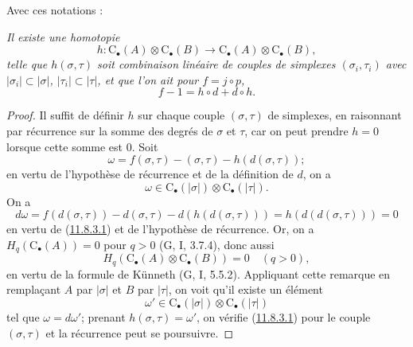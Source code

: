 Avec ces notations :
\begin{proposition}[11.8.3]
\label{0.11.8.3-fr}
\emph{Il existe une homotopie
\[
h:\mathrm C_\bullet(A)\otimes\mathrm C_\bullet(B)
\longrightarrow\mathrm C_\bullet(A)\otimes\mathrm C_\bullet(B),
\]
telle que $h(\sigma,\tau)$ soit combinaison linéaire de couples de simplexes
$(\sigma_i,\tau_i)$ avec $|\sigma_i|\subset|\sigma|$,
$|\tau_i|\subset|\tau|$, et que l'on ait pour $f=j\circ p$,}
\[
\label{0.11.8.3.1-fr}
\tag{11.8.3.1}
f-1=h\circ d+d\circ h.
\]
\end{proposition}

\begin{proof}
Il suffit de définir $h$ sur chaque couple $(\sigma,\tau)$ de simplexes, en
raisonnant par récurrence sur la somme des degrés de $\sigma$ et $\tau$, car
on peut prendre $h=0$ lorsque cette somme est $0$. Soit
\[
\omega=f(\sigma,\tau)-(\sigma,\tau)-h(d(\sigma,\tau));
\]
en vertu de l'hypothèse de récurrence et de la définition de $d$, on a
\[
\omega\in\mathrm C_\bullet(|\sigma|)\otimes\mathrm C_\bullet(|\tau|).
\]
On a
\[
d\omega=f(d(\sigma,\tau))-d(\sigma,\tau)-d(h(d(\sigma,\tau)))
=h(d(d(\sigma,\tau)))=0
\]
en vertu de (\hyperref[0.11.8.3.1-fr]{11.8.3.1}) et de l'hypothèse de
récurrence. Or, on a
$H_q(\mathrm C_\bullet(A))=0$ pour $q>0$ (G, I, 3.7.4), donc aussi
\[
H_q(\mathrm C_\bullet(A)\otimes\mathrm C_\bullet(B))=0\quad(q>0),
\]
en vertu de la formule de Künneth (G, I, 5.5.2). Appliquant cette remarque en
remplaçant $A$ par $|\sigma|$ et $B$ par $|\tau|$, on voit qu'il existe un
élément
\[
\omega'\in\mathrm C_\bullet(|\sigma|)\otimes\mathrm C_\bullet(|\tau|)
\]
tel que $\omega=d\omega'$; prenant $h(\sigma,\tau)=\omega'$, on vérifie
(\hyperref[0.11.8.3.1-fr]{11.8.3.1}) pour le couple $(\sigma,\tau)$ et la
récurrence peut se poursuivre.
\end{proof}

